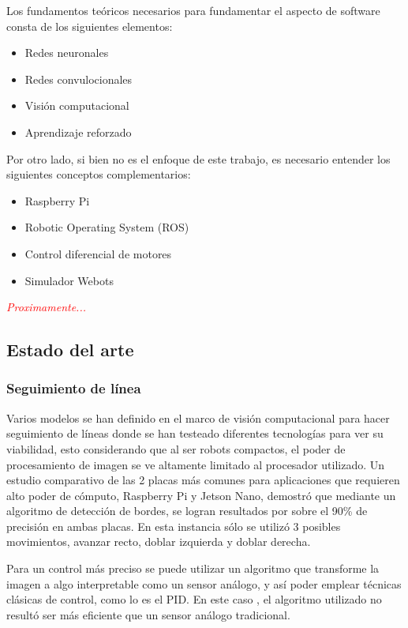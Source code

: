 
Los fundamentos teóricos necesarios para fundamentar el aspecto de software consta de los siguientes elementos:
\begin{itemize}
\item Redes neuronales
\item Redes convulocionales
\item Visión computacional
\item Aprendizaje reforzado
\end{itemize}

Por otro lado, si bien no es el enfoque de este trabajo, es necesario entender los siguientes conceptos complementarios:
\begin{itemize}
\item Raspberry Pi
\item Robotic Operating System (ROS)
\item Control diferencial de motores
\item Simulador Webots
\end{itemize}

\textit{\textcolor{red}{Proximamente...}}

\subsection{Estado del arte}

\subsubsection{Seguimiento de línea}
Varios modelos se han definido en el marco de visión computacional para hacer seguimiento de líneas donde se han testeado diferentes tecnologías para ver su viabilidad, esto considerando que al ser robots compactos, el poder de procesamiento de imagen se ve altamente limitado al procesador utilizado. Un estudio comparativo \cite{raspvsjetson} de las 2 placas más comunes para aplicaciones que requieren alto poder de cómputo, Raspberry Pi y Jetson Nano, demostró que mediante un algoritmo de detección de bordes, se logran resultados por sobre el 90\% de precisión en ambas placas. En esta instancia sólo se utilizó 3 posibles movimientos, avanzar recto, doblar izquierda y doblar derecha. 

Para un control más preciso se puede utilizar un algoritmo que transforme la imagen a algo interpretable como un sensor análogo, y así poder emplear técnicas clásicas de control, como lo es el PID. En este caso \cite{visiontopid}, el algoritmo utilizado no resultó ser más eficiente que un sensor análogo tradicional. 

